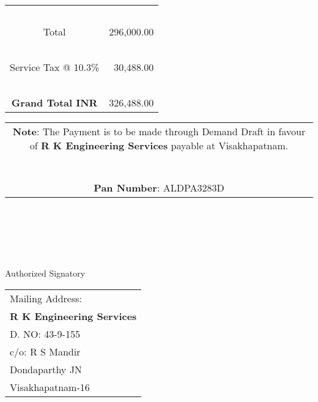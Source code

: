 \documentclass[11pt,A4]{article}
\begin{document}
\vspace*{0.2cm}

\hspace*{13.15cm}
\begin{tabular}{|c|r|}
\hline
\ & \\
Total & 296,000.00 \\
\hline
\ & \\
Service Tax @ 10.3\% & 30,488.00 \\
\hline
\ & \\
{\bf Grand Total INR} & 326,488.00 \\
\hline
\end{tabular}

\vspace*{-1.75cm}
\noindent \begin{tabular}{c}
\parbox{4in}{ {\bf Note}: The Payment is to be made through Demand Draft in favour of {\bf R K Engineering Services} payable at Visakhapatnam. \\ \\ \\
{\noindent \bf Pan Number}:  ALDPA3283D }\\
\end{tabular}
\vspace*{95pt}


 \\ \\ \\ \\ \\
\noindent Authorized Signatory
\vspace*{-71pt}
\begin{flushright}
\begin{tabular}{l}
Mailing Address:\\
{\bf R K Engineering Services}\\
D. NO: 43-9-155\\
c/o: R  S Mandir\\
Dondaparthy JN\\ 
Visakhapatnam-16\\
\end{tabular}
\end{flushright}
\end{document}
